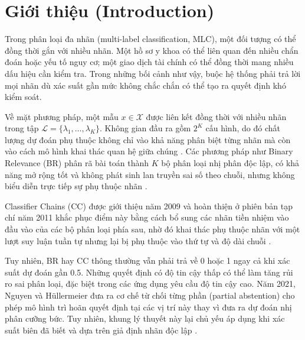 \documentclass[11pt,a4paper]{article}
\begin{document}
\vspace{0.4cm}
\section{Giới thiệu (Introduction)}
\label{sec:introduction}

Trong phân loại đa nhãn (multi-label classification, MLC), một đối tượng có thể đồng thời gắn với nhiều nhãn. Một hồ sơ y khoa có thể liên quan đến nhiều chẩn đoán hoặc yếu tố nguy cơ; một giao dịch tài chính có thể đồng thời mang nhiều dấu hiệu cần kiểm tra. Trong những bối cảnh như vậy, buộc hệ thống phải trả lời mọi nhãn dù xác suất gần mức không chắc chắn có thể tạo ra quyết định khó kiểm soát.

Về mặt phương pháp, một mẫu $x \in \mathcal{X}$ được liên kết đồng thời với nhiều nhãn trong tập $\mathcal{L} = \{\lambda_1, \dots, \lambda_K\}$. Không gian đầu ra gồm $2^K$ cấu hình, do đó chất lượng dự đoán phụ thuộc không chỉ vào khả năng phân biệt từng nhãn mà còn vào cách mô hình khai thác quan hệ giữa chúng \cite{zhang2014review, dembczynski2012bayes}. Các phương pháp như Binary Relevance (BR) phân rã bài toán thành $K$ bộ phân loại nhị phân độc lập, có khả năng mở rộng tốt và không phát sinh lan truyền sai số theo chuỗi, nhưng không biểu diễn trực tiếp sự phụ thuộc nhãn \cite{zhang2018binary}.

Classifier Chains (CC) được giới thiệu năm 2009 và hoàn thiện ở phiên bản tạp chí năm 2011 khắc phục điểm này bằng cách bổ sung các nhãn tiền nhiệm vào đầu vào của các bộ phân loại phía sau, nhờ đó khai thác phụ thuộc nhãn với một lượt suy luận tuần tự nhưng lại bị phụ thuộc vào thứ tự và độ dài chuỗi \cite{read2011classifier}.

Tuy nhiên, BR hay CC thông thường vẫn phải trả về 0 hoặc 1 ngay cả khi xác suất dự đoán gần 0.5. Những quyết định có độ tin cậy thấp có thể làm tăng rủi ro sai phân loại, đặc biệt trong các ứng dụng yêu cầu độ tin cậy cao. Năm 2021, Nguyen và Hüllermeier đưa ra cơ chế từ chối từng phần (partial abstention) cho phép mô hình trì hoãn quyết định tại các vị trí này thay vì đưa ra dự đoán nhị phân cưỡng bức. Tuy nhiên, khung lý thuyết này lại chủ yếu áp dụng khi xác suất biên đã biết và dựa trên giả định nhãn độc lập \cite{nguyen2020reliable, nguyen2021multilabel}.
\end{document}
